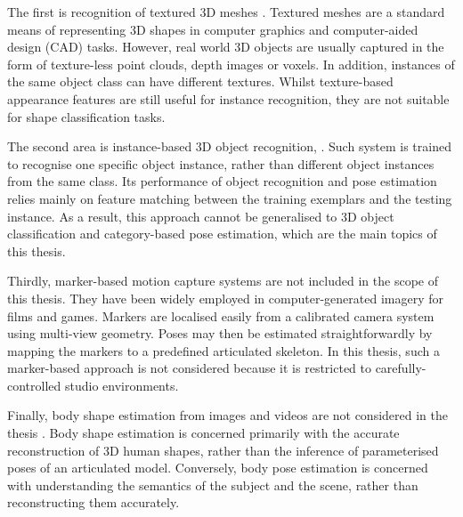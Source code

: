 The first is recognition of textured 3D meshes \cite{Zaharescu2009, Bronstein2011, Kokkinos2012}. Textured meshes are a standard means of representing 3D shapes in computer graphics and computer-aided design (CAD) tasks. 
However, real world 3D objects are usually captured in the form of texture-less point clouds, depth images or voxels. 
In addition, instances of the same object class can have different textures. Whilst texture-based appearance features are still useful for instance recognition, they are not suitable for shape classification tasks.  

The second area is instance-based 3D object recognition, \eg \cite{Mian2006, Rothganger2006, Shang2010}. Such system is trained to recognise one specific object instance, rather than different object instances from the same class. Its performance of object recognition and pose estimation relies mainly on feature matching between the training exemplars and the testing instance. As a result, this approach cannot be generalised to 3D object classification and category-based pose estimation, which are the main topics of this thesis.    
   

Thirdly, marker-based motion capture systems are not included in the scope of this thesis. They have been widely employed in computer-generated imagery for films and games. Markers are localised easily from a calibrated camera system using multi-view geometry. Poses may then be estimated straightforwardly by mapping the markers to a predefined articulated skeleton. In this thesis, such a marker-based approach is not considered because it is restricted to carefully-controlled studio environments.  
 
Finally, body shape estimation from images and videos are not considered in the thesis \cite{Guan2009, Rother2009, Chen2011}. 
Body shape estimation is concerned primarily with the accurate reconstruction of 3D human shapes, rather than the inference of parameterised poses of an articulated model. Conversely, body pose estimation is concerned with understanding the semantics of the subject and the scene, rather than reconstructing them accurately. 

